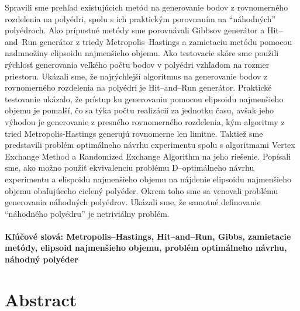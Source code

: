 \documentclass[12pt, twoside]{book}
\begin{document}
Spravili sme prehľad existujúcich metód na generovanie bodov z rovnomerného rozdelenia na polyédri, spolu s ich praktickým porovnaním na ``náhodných'' polyédroch. 
Ako prípustné metódy sme porovnávali Gibbsov generátor a Hit--and--Run generátor z triedy Metropolis--Hastings a zamietaciu metódu pomocou nadmnožiny elipsoidu najmenšieho objemu. Ako testovacie skóre sme použili rýchlosť generovania veľkého počtu bodov v polyédri vzhľadom na rozmer priestoru. Ukázali sme, že najrýchlejší algoritmus na generovanie bodov z rovnomerného rozdelenia na polyédri je Hit--and--Run generátor. Praktické testovanie ukázalo, že prístup ku generovaniu pomocou elipsoidu najmenšieho objemu je pomalší, čo sa týka počtu realizácií za jednotku času, avšak jeho výhodou je generovanie z presného rovnomerného rozdelenia, kým algoritmy z tried Metropolis-Hastings generujú rovnomerne len limitne. Taktiež sme predstavili problém optimálneho návrhu experimentu spolu s algoritmami Vertex Exchange Method a Randomized Exchange Algorithm na jeho riešenie. Popísali sme, ako možno použiť ekvivalenciu problému D--optimálneho návrhu experimentu a elispoidu najmenšieho objemu na nájdenie elipsoidu najmenšieho objemu obaľujúceho cielený polyéder. Okrem toho sme sa venovali problému generovania náhodných polyédrov. Ukázali sme, že samotné definovanie ``náhodného polyédru'' je netriviálny problém.

\paragraph*{Kľúčové slová: Metropolis--Hastings, Hit--and--Run, Gibbs, zamietacie metódy, elipsoid najmenšieho objemu, problém optimálneho návrhu, náhodný polyéder}


\newpage 
\section*{Abstract}
\end{document}
